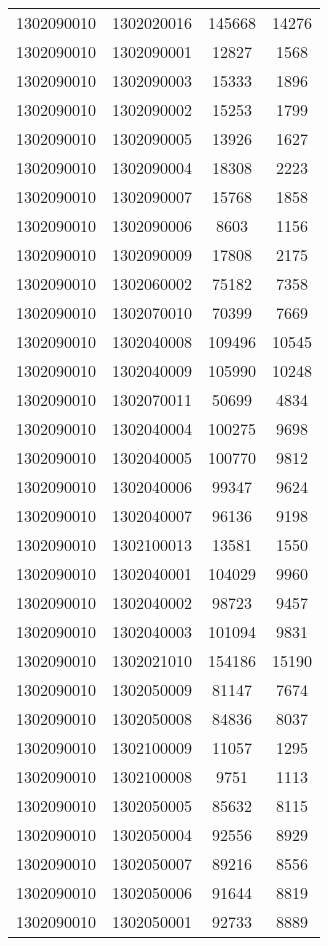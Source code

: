 \begin{longtable}[h]{llcc}
		1302090010 & 1302020016 & 145668 & 14276\\
		1302090010 & 1302090001 & 12827 & 1568\\
		1302090010 & 1302090003 & 15333 & 1896\\
		1302090010 & 1302090002 & 15253 & 1799\\
		1302090010 & 1302090005 & 13926 & 1627\\
		1302090010 & 1302090004 & 18308 & 2223\\
		1302090010 & 1302090007 & 15768 & 1858\\
		1302090010 & 1302090006 & 8603 & 1156\\
		1302090010 & 1302090009 & 17808 & 2175\\
		1302090010 & 1302060002 & 75182 & 7358\\
		1302090010 & 1302070010 & 70399 & 7669\\
		1302090010 & 1302040008 & 109496 & 10545\\
		1302090010 & 1302040009 & 105990 & 10248\\
		1302090010 & 1302070011 & 50699 & 4834\\
		1302090010 & 1302040004 & 100275 & 9698\\
		1302090010 & 1302040005 & 100770 & 9812\\
		1302090010 & 1302040006 & 99347 & 9624\\
		1302090010 & 1302040007 & 96136 & 9198\\
		1302090010 & 1302100013 & 13581 & 1550\\
		1302090010 & 1302040001 & 104029 & 9960\\
		1302090010 & 1302040002 & 98723 & 9457\\
		1302090010 & 1302040003 & 101094 & 9831\\
		1302090010 & 1302021010 & 154186 & 15190\\
		1302090010 & 1302050009 & 81147 & 7674\\
		1302090010 & 1302050008 & 84836 & 8037\\
		1302090010 & 1302100009 & 11057 & 1295\\
		1302090010 & 1302100008 & 9751 & 1113\\
		1302090010 & 1302050005 & 85632 & 8115\\
		1302090010 & 1302050004 & 92556 & 8929\\
		1302090010 & 1302050007 & 89216 & 8556\\
		1302090010 & 1302050006 & 91644 & 8819\\
		1302090010 & 1302050001 & 92733 & 8889\\

\end{longtable}

